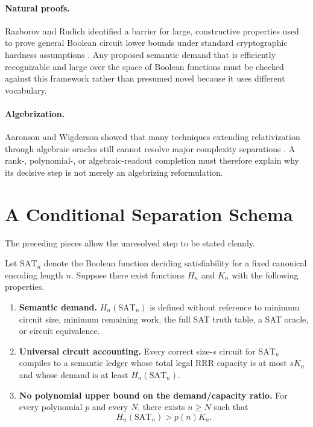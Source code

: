 \documentclass[11pt]{article}
\newcommand{\SAT}{\mathrm{SAT}}
\begin{document}
\paragraph{Natural proofs.}
Razborov and Rudich identified a barrier for large, constructive properties used to prove general Boolean circuit lower bounds under standard cryptographic hardness assumptions \cite{RazborovRudich97}. Any proposed semantic demand that is efficiently recognizable and large over the space of Boolean functions must be checked against this framework rather than presumed novel because it uses different vocabulary.

\paragraph{Algebrization.}
Aaronson and Wigderson showed that many techniques extending relativization through algebraic oracles still cannot resolve major complexity separations \cite{AaronsonWigderson09}. A rank-, polynomial-, or algebraic-readout completion must therefore explain why its decisive step is not merely an algebrizing reformulation.

\section{A Conditional Separation Schema}

The preceding pieces allow the unresolved step to be stated cleanly.

Let $\SAT_n$ denote the Boolean function deciding satisfiability for a fixed canonical encoding length $n$. Suppose there exist functions $H_n$ and $K_n$ with the following properties.

\begin{enumerate}
  \item \textbf{Semantic demand.} $H_n(\SAT_n)$ is defined without reference to minimum circuit size, minimum remaining work, the full SAT truth table, a SAT oracle, or circuit equivalence.
  \item \textbf{Universal circuit accounting.} Every correct size-$s$ circuit for $\SAT_n$ compiles to a semantic ledger whose total legal RRR capacity is at most $sK_n$ and whose demand is at least $H_n(\SAT_n)$.
  \item \textbf{No polynomial upper bound on the demand/capacity ratio.} For every polynomial $p$ and every $N$, there exists $n\ge N$ such that
  \[
  H_n(\SAT_n)>p(n)K_n.
  \]
\end{enumerate}
\end{document}
